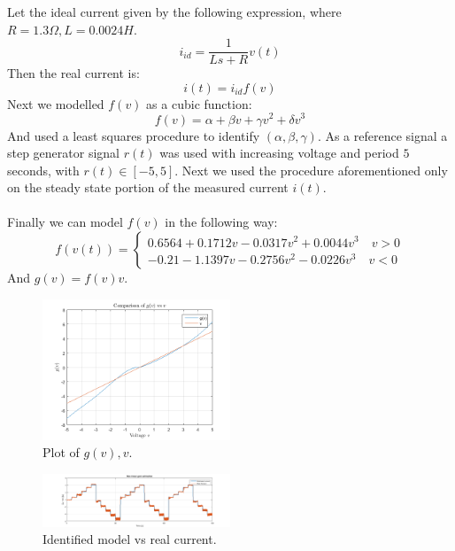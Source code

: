Let the ideal current given by the following expression, where $R=1.3 \Omega, L=0.0024 H$.
\begin{equation}
i_{id}=\frac{1}{Ls+R} v(t)
\end{equation}
Then the real current is:
\begin{equation}
i(t)=  i_{id} f(v)
\end{equation}
Next we modelled $f(v)$ as a cubic function:
\begin{equation}
f(v) = \alpha+\beta v + \gamma v^2+\delta v^3
\end{equation}
And used a least squares procedure to identify $(\alpha, \beta, \gamma)$.
As a reference signal a step generator signal $r(t)$ was used with increasing voltage and period $5$ seconds, with $r(t) \in [-5,5]$. Next we used the procedure aforementioned only on the steady state portion  of the  measured current $i(t)$.\\ \\
Finally we can model $f(v)$ in the following way:
\begin{equation}
f(v(t)) = \begin{cases}
0.6564+0.1712v-0.0317v^2+0.0044v^3 \quad v>0 \\
-0.21-1.1397v-0.2756v^2-0.0226v^3 \quad v< 0
\end{cases}
\end{equation}
And $g(v) =f(v)v$.
  \begin{figure}[!h]
  \centering
  \includegraphics[width=0.5\textwidth]{img/nonlinear_gain.png}
  \caption{Plot of $g(v),v$.}
\end{figure}
  \begin{figure}[!h]
  \centering
  \includegraphics[width=0.5\textwidth]{img/nonlinear_gain2.png}
  \caption{Identified model vs real current.}
    \label{fig:nlg2}
    \end{figure}
